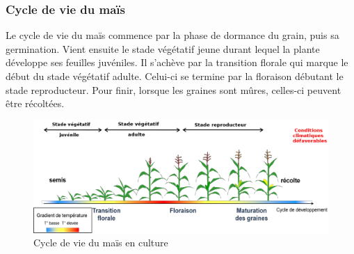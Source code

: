 \documentclass[12pt,a4paper]{report}
\begin{document}
				\subsubsection{Cycle de vie du maïs}
				Le cycle de vie du maïs commence par la phase de dormance du grain, puis sa germination. Vient ensuite le stade végétatif jeune durant lequel la plante développe ses feuilles juvéniles. Il s'achève par la transition florale qui marque le début du stade végétatif adulte. Celui-ci se termine par la floraison débutant le stade reproducteur. Pour finir, lorsque les graines sont mûres, celles-ci peuvent être récoltées.
				\begin{figure}[!h]
					\centering
					\includegraphics[width=13.7cm]{cycle.png}
					\caption{Cycle de vie du maïs en culture}
					\label{Cycle de vie du maïs en culture}
				\end{figure}
					
			
\end{document}
